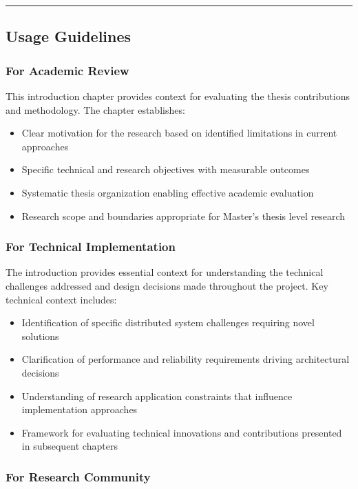 \documentclass[11pt,a4paper]{article}
\begin{document}
\hrule

\subsection{Usage Guidelines}

\subsubsection{For Academic Review}

This introduction chapter provides context for evaluating the thesis
contributions and methodology.  The
chapter establishes:

\begin{itemize}
\item Clear motivation for the research based on identified limitations in current approaches
\item Specific technical and research objectives with measurable outcomes
\item Systematic thesis organization enabling effective academic evaluation
\item Research scope and boundaries appropriate for Master's thesis level research

\end{itemize}
\subsubsection{For Technical Implementation}

The introduction provides essential context for understanding the technical
challenges addressed and design decisions
made throughout the project. Key technical context includes:

\begin{itemize}
\item Identification of specific distributed system challenges requiring novel solutions
\item Clarification of performance and reliability requirements driving architectural decisions
\item Understanding of research application constraints that influence implementation approaches
\item Framework for evaluating technical innovations and contributions presented in subsequent chapters

\end{itemize}
\subsubsection{For Research Community}
\end{document}
